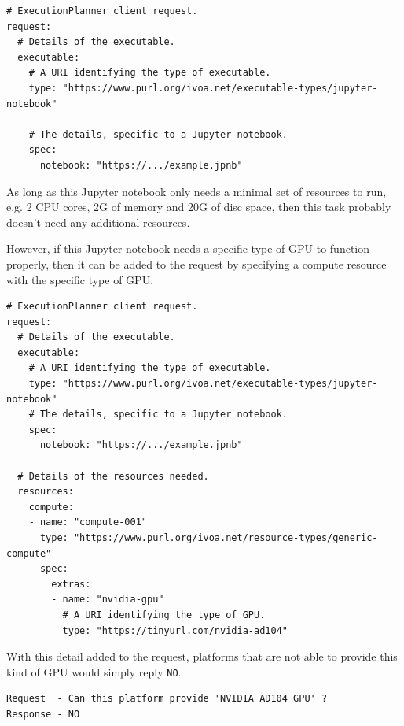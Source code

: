 \documentclass[11pt,a4paper]{ivoa}
\newcommand{\jupyternotebook} {Jupyter notebook}
\newcommand{\codeword}[1] {\texttt{#1}}
\newcommand{\cpu} {CPU}
\newcommand{\gpu} {GPU}
\begin{document}
\begin{lstlisting}[]
# ExecutionPlanner client request.
request:
  # Details of the executable.
  executable:
    # A URI identifying the type of executable.
    type: "https://www.purl.org/ivoa.net/executable-types/jupyter-notebook"

    # The details, specific to a Jupyter notebook.
    spec:
      notebook: "https://.../example.jpnb"
\end{lstlisting}

As long as this \jupyternotebook{} only needs a minimal set of resources to run, e.g.
2 \cpu{} cores, 2G of memory and 20G of disc space, then this task probably doesn't need
any additional resources.

However, if this \jupyternotebook{} needs a specific type of \gpu{} to function properly,
then it can be added to the request by specifying a compute resource with the specific type
of \gpu{}.

\begin{lstlisting}[]
# ExecutionPlanner client request.
request:
  # Details of the executable.
  executable:
    # A URI identifying the type of executable.
    type: "https://www.purl.org/ivoa.net/executable-types/jupyter-notebook"
    # The details, specific to a Jupyter notebook.
    spec:
      notebook: "https://.../example.jpnb"

  # Details of the resources needed.
  resources:
    compute:
    - name: "compute-001"
      type: "https://www.purl.org/ivoa.net/resource-types/generic-compute"
      spec:
        extras:
        - name: "nvidia-gpu"
          # A URI identifying the type of GPU.
          type: "https://tinyurl.com/nvidia-ad104"
\end{lstlisting}

With this detail added to the request, platforms that are not able to provide this kind of \gpu{}
would simply reply \codeword{NO}.

\begin{lstlisting}[]
Request  - Can this platform provide 'NVIDIA AD104 GPU' ?
Response - NO
\end{lstlisting}
\end{document}
